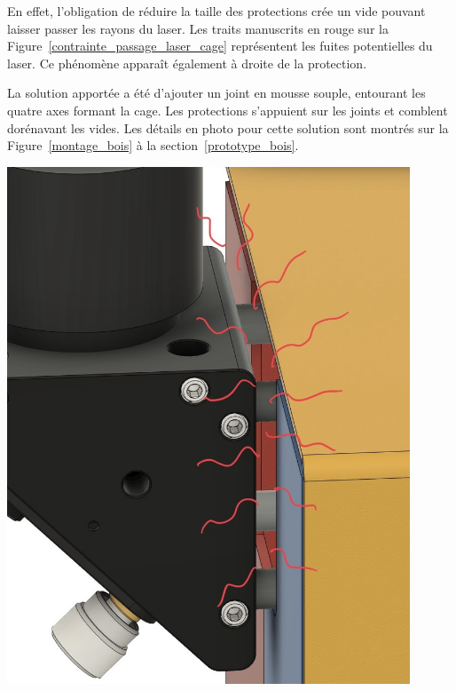 \begin{minipage}[c]{0.5\textwidth}
    En effet, l'obligation de réduire la taille des protections crée un vide pouvant laisser passer les rayons du laser. Les traits manuscrits en rouge sur la Figure~\ref{contrainte_passage_laser_cage} représentent les fuites potentielles du laser. Ce phénomène apparaît également à droite de la protection.

    La solution apportée a été d'ajouter un joint en mousse souple, entourant les quatre axes formant la cage. Les protections s'appuient sur les joints et comblent dorénavant les vides. Les détails en photo pour cette solution sont montrés sur la Figure~\ref{montage_bois} à la section~\ref{prototype_bois}.
\end{minipage}\hfill
\begin{minipage}[c]{0.48\textwidth}
    \begin{center}
        \includegraphics[width=0.9\textwidth]{assets/figures/Protections_laser/Securite_mecanique/Protection_entree_laser/contrainte_passage_laser_cage.jpeg}
    \end{center}
    \label{contrainte_passage_laser_cage}
\end{minipage}

